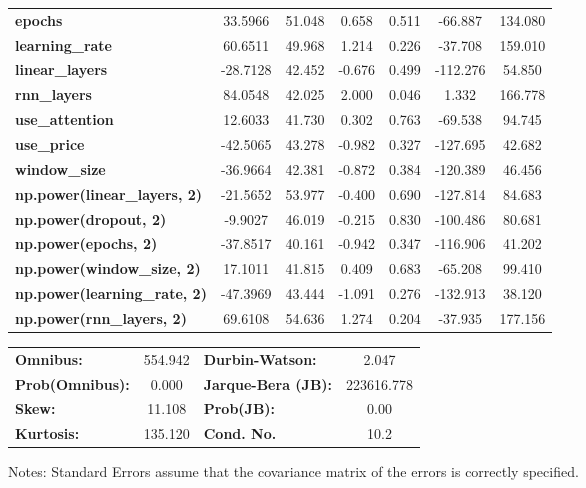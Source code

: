 \begin{center}
\begin{tabular}{lcccccc}
\textbf{epochs}                            &      33.5966  &       51.048     &     0.658  &         0.511        &      -66.887    &      134.080     \\
\textbf{learning\_rate}                    &      60.6511  &       49.968     &     1.214  &         0.226        &      -37.708    &      159.010     \\
\textbf{linear\_layers}                    &     -28.7128  &       42.452     &    -0.676  &         0.499        &     -112.276    &       54.850     \\
\textbf{rnn\_layers}                       &      84.0548  &       42.025     &     2.000  &         0.046        &        1.332    &      166.778     \\
\textbf{use\_attention}                    &      12.6033  &       41.730     &     0.302  &         0.763        &      -69.538    &       94.745     \\
\textbf{use\_price}                        &     -42.5065  &       43.278     &    -0.982  &         0.327        &     -127.695    &       42.682     \\
\textbf{window\_size}                      &     -36.9664  &       42.381     &    -0.872  &         0.384        &     -120.389    &       46.456     \\
\textbf{np.power(linear\_layers, 2)}       &     -21.5652  &       53.977     &    -0.400  &         0.690        &     -127.814    &       84.683     \\
\textbf{np.power(dropout, 2)}              &      -9.9027  &       46.019     &    -0.215  &         0.830        &     -100.486    &       80.681     \\
\textbf{np.power(epochs, 2)}               &     -37.8517  &       40.161     &    -0.942  &         0.347        &     -116.906    &       41.202     \\
\textbf{np.power(window\_size, 2)}         &      17.1011  &       41.815     &     0.409  &         0.683        &      -65.208    &       99.410     \\
\textbf{np.power(learning\_rate, 2)}       &     -47.3969  &       43.444     &    -1.091  &         0.276        &     -132.913    &       38.120     \\
\textbf{np.power(rnn\_layers, 2)}          &      69.6108  &       54.636     &     1.274  &         0.204        &      -37.935    &      177.156     \\
\bottomrule
\end{tabular}
\begin{tabular}{lclc}
\textbf{Omnibus:}       & 554.942 & \textbf{  Durbin-Watson:     } &     2.047   \\
\textbf{Prob(Omnibus):} &   0.000 & \textbf{  Jarque-Bera (JB):  } & 223616.778  \\
\textbf{Skew:}          &  11.108 & \textbf{  Prob(JB):          } &      0.00   \\
\textbf{Kurtosis:}      & 135.120 & \textbf{  Cond. No.          } &      10.2   \\
\bottomrule
\end{tabular}
\end{center}

Notes: \newline
 [1] Standard Errors assume that the covariance matrix of the errors is correctly specified.